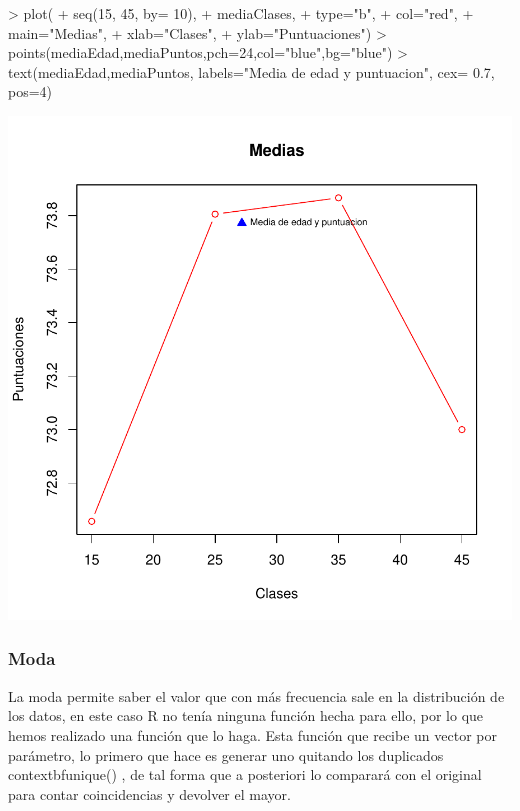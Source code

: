 \documentclass [a4paper] {article}
\begin{document}
\begin{Schunk}
\begin{Sinput}
> plot(
+         seq(15, 45, by= 10),
+         mediaClases,
+         type="b",
+         col="red",
+         main="Medias",
+         xlab="Clases",
+         ylab="Puntuaciones")
> points(mediaEdad,mediaPuntos,pch=24,col="blue",bg="blue")
> text(mediaEdad,mediaPuntos, labels="Media de edad y puntuacion", cex= 0.7, pos=4)
\end{Sinput}
\end{Schunk}

\begin{center}
\includegraphics{Practica1-034}
\end{center}

\subsubsection{ Moda}
La moda permite saber el valor que con más frecuencia sale en la distribución de los datos, en este caso R no tenía ninguna función hecha para ello, por lo
que hemos realizado una función que lo haga. Esta función que recibe un vector por parámetro, lo primero que hace es generar 
uno quitando los duplicados contextbf{unique()}  , de tal forma
que a posteriori lo comparará con el original para contar coincidencias y devolver el mayor.
\end{document}
